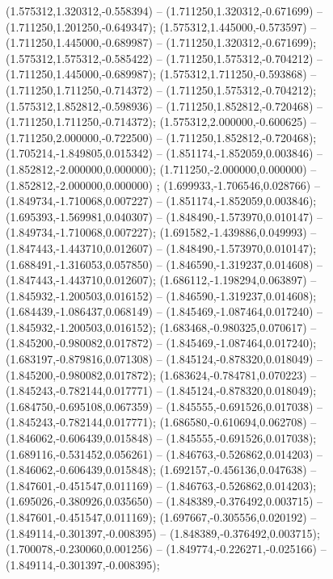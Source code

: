  (1.575312,1.320312,-0.558394) -- (1.711250,1.320312,-0.671699) -- (1.711250,1.201250,-0.649347);
 (1.575312,1.445000,-0.573597) -- (1.711250,1.445000,-0.689987) -- (1.711250,1.320312,-0.671699);
 (1.575312,1.575312,-0.585422) -- (1.711250,1.575312,-0.704212) -- (1.711250,1.445000,-0.689987);
 (1.575312,1.711250,-0.593868) -- (1.711250,1.711250,-0.714372) -- (1.711250,1.575312,-0.704212);
 (1.575312,1.852812,-0.598936) -- (1.711250,1.852812,-0.720468) -- (1.711250,1.711250,-0.714372);
 (1.575312,2.000000,-0.600625) -- (1.711250,2.000000,-0.722500) -- (1.711250,1.852812,-0.720468);
 (1.705214,-1.849805,0.015342) -- (1.851174,-1.852059,0.003846) -- (1.852812,-2.000000,0.000000);
 (1.711250,-2.000000,0.000000) -- (1.852812,-2.000000,0.000000) ;
 (1.699933,-1.706546,0.028766) -- (1.849734,-1.710068,0.007227) -- (1.851174,-1.852059,0.003846);
 (1.695393,-1.569981,0.040307) -- (1.848490,-1.573970,0.010147) -- (1.849734,-1.710068,0.007227);
 (1.691582,-1.439886,0.049993) -- (1.847443,-1.443710,0.012607) -- (1.848490,-1.573970,0.010147);
 (1.688491,-1.316053,0.057850) -- (1.846590,-1.319237,0.014608) -- (1.847443,-1.443710,0.012607);
 (1.686112,-1.198294,0.063897) -- (1.845932,-1.200503,0.016152) -- (1.846590,-1.319237,0.014608);
 (1.684439,-1.086437,0.068149) -- (1.845469,-1.087464,0.017240) -- (1.845932,-1.200503,0.016152);
 (1.683468,-0.980325,0.070617) -- (1.845200,-0.980082,0.017872) -- (1.845469,-1.087464,0.017240);
 (1.683197,-0.879816,0.071308) -- (1.845124,-0.878320,0.018049) -- (1.845200,-0.980082,0.017872);
 (1.683624,-0.784781,0.070223) -- (1.845243,-0.782144,0.017771) -- (1.845124,-0.878320,0.018049);
 (1.684750,-0.695108,0.067359) -- (1.845555,-0.691526,0.017038) -- (1.845243,-0.782144,0.017771);
 (1.686580,-0.610694,0.062708) -- (1.846062,-0.606439,0.015848) -- (1.845555,-0.691526,0.017038);
 (1.689116,-0.531452,0.056261) -- (1.846763,-0.526862,0.014203) -- (1.846062,-0.606439,0.015848);
 (1.692157,-0.456136,0.047638) -- (1.847601,-0.451547,0.011169) -- (1.846763,-0.526862,0.014203);
 (1.695026,-0.380926,0.035650) -- (1.848389,-0.376492,0.003715) -- (1.847601,-0.451547,0.011169);
 (1.697667,-0.305556,0.020192) -- (1.849114,-0.301397,-0.008395) -- (1.848389,-0.376492,0.003715);
 (1.700078,-0.230060,0.001256) -- (1.849774,-0.226271,-0.025166) -- (1.849114,-0.301397,-0.008395);
